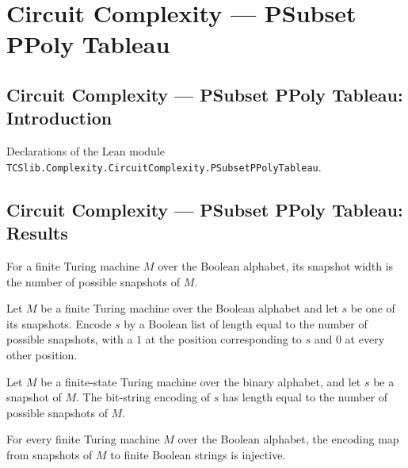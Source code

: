 \section{Circuit Complexity --- PSubset PPoly Tableau}
\subsection*{Circuit Complexity --- PSubset PPoly Tableau: Introduction}

Declarations of the Lean module \texttt{TCSlib.Complexity.CircuitComplexity.PSubsetPPolyTableau}.

\subsection*{Circuit Complexity --- PSubset PPoly Tableau: Results}

\begin{definition}
\label{Complexity.snapWidth}
\leanok
{}
For a finite Turing machine $M$ over the Boolean alphabet, its snapshot width is the
number of possible snapshots of $M$.
\end{definition}

\begin{definition}
\label{Complexity.snapEncode}
\leanok
{}
Let $M$ be a finite Turing machine over the Boolean alphabet and let $s$ be one of its
snapshots. Encode $s$ by a Boolean list of length equal to the number of possible
snapshots, with a $1$ at the position corresponding to $s$ and $0$ at every other
position.
\end{definition}

\begin{theorem}
\label{Complexity.length_snapEncode}
\leanok
{}
Let $M$ be a finite-state Turing machine over the binary alphabet, and let $s$ be a
snapshot of $M$. The bit-string encoding of $s$ has length equal to the number of
possible snapshots of $M$.
\end{theorem}

\begin{theorem}
\label{Complexity.snapEncode_injective}
\leanok
{}
For every finite Turing machine $M$ over the Boolean alphabet, the encoding map from
snapshots of $M$ to finite Boolean strings is injective.
\end{theorem}

